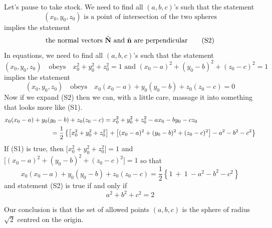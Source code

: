 \begin{eg}[Optional]
Let's pause to take stock.
We need to find all $(a,b,c)$'s such that the statement
\begin{equation*}
(x_0,y_0,z_0)\text{ is a point of intersection of the two spheres}
\tag{S1}\end{equation*}
implies the statement
\begin{equation*}
\text{the normal vectors $\hat{\mathbf{N}}$ and $\hat{\mathbf{n}}$ are perpendicular}
\tag{S2}\end{equation*}
In equations, we need to find all $(a,b,c)$'s such that the statement
\begin{equation}
(x_0,y_0,z_0)\quad\text{obeys}\quad 
x_0^2+y_0^2+z_0^2 = 1\text{ and }(x_0-a)^2+(y_0-b)^2+(z_0-c)^2 = 1
\tag{S1}
\end{equation}
implies the statement
\begin{equation}
(x_0,y_0,z_0)\quad\text{obeys}\quad 
x_0(x_0-a) + y_0(y_0-b) +z_0(z_0-c)=0
\tag{S2}
\end{equation}
Now if we expand (S2) then we can, with a little care, massage it into something that looks more like (S1).
\begin{align*}
&x_0(x_0-a) + y_0(y_0-b) +z_0(z_0-c)
=x_0^2+y_0^2+z_0^2 -ax_0 -by_0 - cz_0 \\
&\hskip1in=\frac{1}{2}\left\{\big[x_0^2+y_0^2+z_0^2\big]
     +\big[(x_0-a)^2+(y_0-b)^2+(z_0-c)^2\big]
     -a^2-b^2-c^2\right\}
\end{align*}
If (S1) is true, then $\big[x_0^2+y_0^2+z_0^2\big]=1$
and $\big[(x_0-a)^2+(y_0-b)^2+(z_0-c)^2\big]=1$ so that
\begin{equation*}
x_0(x_0-a) + y_0(y_0-b) +z_0(z_0-c)
=\frac{1}{2}\left\{1 \ +\  1\  -a^2-b^2-c^2 \right\}
\end{equation*}
and statement (S2) is true if and only if
\begin{equation*}
a^2+b^2+c^2=2
\end{equation*}

Our conclusion is that the set of allowed points $(a,b,c)$ is the
sphere of radius $\sqrt{2}$ centred on the origin.
\end{eg}

